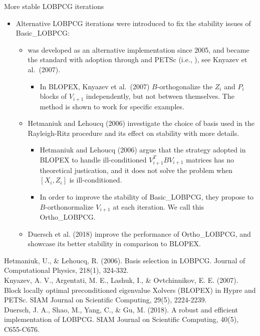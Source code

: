 \documentclass[t,usepdftitle=false]{beamer}
\begin{document}
\begin{frame}{More stable LOBPCG iterations}
	\begin{itemize}
	\item Alternative LOBPCG iterations were introduced to fix the stability issues of Basic\_LOBPCG:
	\begin{itemize}
	\item {} was developed as an alternative implementation since 2005,
	and became the standard with adoption through {} and PETSc (i.e., {}), see Knyazev et al.~(2007).
	\begin{itemize}
	\item In BLOPEX, Knyazev et al.~(2007) $B$-orthogonalize the $Z_i$ and $P_i$ blocks of $V_{i+1}$ independently, but not between themselves.
	The method is shown to work for specific examples.
	\end{itemize}
	\item Hetmaniuk and Lehoucq (2006) investigate the choice of basis used in the Rayleigh-Ritz procedure and its effect on stability with more details.
	\begin{itemize}
	\item Hetmaniuk and Lehoucq (2006) argue that the strategy adopted in BLOPEX to handle ill-conditioned $V_{i+1}^TBV_{i+1}$ matrices has no theoretical justication, and it does not solve the problem when $[X_i,Z_i]$ is ill-conditioned.
	\item In order to improve the stability of Basic\_LOBPCG, they propose to $B$-orthonormalize $V_{i+1}$ at each iteration.
	We call this Ortho\_LOBPCG.
	\end{itemize}
	\item Duersch et al. (2018) improve the performance of Ortho\_LOBPCG, and showcase its better stability in comparison to BLOPEX.
	\end{itemize}
	\end{itemize}	
	\smallskip
	\tiny{Hetmaniuk, U., \& Lehoucq, R. (2006). Basis selection in LOBPCG. Journal of Computational Physics, 218(1), 324-332.}\tinyskip\\
	\tiny{Knyazev, A. V., Argentati, M. E., Lashuk, I., \& Ovtchinnikov, E. E. (2007). Block locally optimal preconditioned eigenvalue Xolvers (BLOPEX) in Hypre and PETSc. SIAM Journal on Scientific Computing, 29(5), 2224-2239.}\tinyskip\\	
	\tiny{Duersch, J. A., Shao, M., Yang, C., \& Gu, M. (2018). A robust and efficient implementation of LOBPCG. SIAM Journal on Scientific Computing, 40(5), C655-C676.}
\end{frame}
\end{document}
